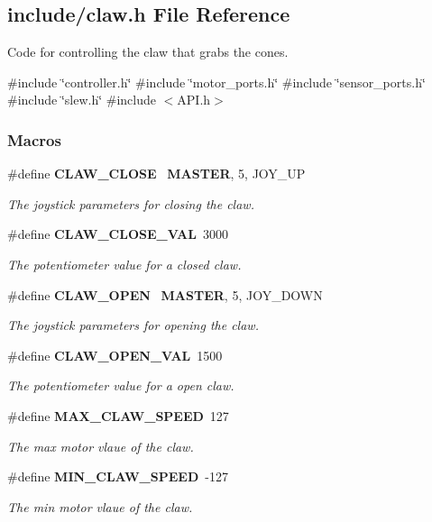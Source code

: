 \subsection{include/claw.h File Reference}
\label{a00008}


Code for controlling the claw that grabs the cones.  


{\ttfamily \#include \char`\"{}controller.\+h\char`\"{}}\newline
{\ttfamily \#include \char`\"{}motor\+\_\+ports.\+h\char`\"{}}\newline
{\ttfamily \#include \char`\"{}sensor\+\_\+ports.\+h\char`\"{}}\newline
{\ttfamily \#include \char`\"{}slew.\+h\char`\"{}}\newline
{\ttfamily \#include $<$A\+P\+I.\+h$>$}\newline
\subsubsection*{Macros}
\begin{DoxyCompactItemize}
\item 
\#define \textbf{ C\+L\+A\+W\+\_\+\+C\+L\+O\+SE}~\textbf{ M\+A\+S\+T\+ER}, 5, J\+O\+Y\+\_\+\+UP
\begin{DoxyCompactList}\small\item\em The joystick parameters for closing the claw. \end{DoxyCompactList}\item 
\#define \textbf{ C\+L\+A\+W\+\_\+\+C\+L\+O\+S\+E\+\_\+\+V\+AL}~3000
\begin{DoxyCompactList}\small\item\em The potentiometer value for a closed claw. \end{DoxyCompactList}\item 
\#define \textbf{ C\+L\+A\+W\+\_\+\+O\+P\+EN}~\textbf{ M\+A\+S\+T\+ER}, 5, J\+O\+Y\+\_\+\+D\+O\+WN
\begin{DoxyCompactList}\small\item\em The joystick parameters for opening the claw. \end{DoxyCompactList}\item 
\#define \textbf{ C\+L\+A\+W\+\_\+\+O\+P\+E\+N\+\_\+\+V\+AL}~1500
\begin{DoxyCompactList}\small\item\em The potentiometer value for a open claw. \end{DoxyCompactList}\item 
\#define \textbf{ M\+A\+X\+\_\+\+C\+L\+A\+W\+\_\+\+S\+P\+E\+ED}~127
\begin{DoxyCompactList}\small\item\em The max motor vlaue of the claw. \end{DoxyCompactList}\item 
\#define \textbf{ M\+I\+N\+\_\+\+C\+L\+A\+W\+\_\+\+S\+P\+E\+ED}~-\/127
\begin{DoxyCompactList}\small\item\em The min motor vlaue of the claw. \end{DoxyCompactList}\end{DoxyCompactItemize}
